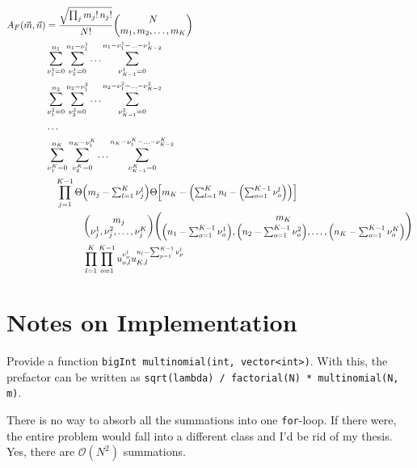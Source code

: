 \documentclass[
	english,
	a4paper,
	fontsize=10pt,
	parskip=half,
	titlepage=true,
	DIV=12,
	final
]{scrreprt}
\begin{document}
\begin{align}
\nonumber
	A_F(\vec{m}, \vec{n})
&=
	\frac
		{\sqrt{\prod_j m_j! \, n_j!}}
		{N!}
	\mqty(
		N \\
		m_1, m_2, \ldots, m_K
	) \\ 
\nonumber
&	\sum_{\nu_1^1 = 0}^{n_1}
	\sum_{\nu_2^1 = 0}^{n_1 - \nu_1^1}
	\ldots
	\sum_{\nu_{K-1}^1 = 0}^{n_1 - \nu_1^1 - \ldots - \nu_{K-2}^1} \\
\nonumber
&	\sum_{\nu_1^2 = 0}^{n_2}
	\sum_{\nu_2^2 = 0}^{n_2 - \nu_1^2}
	\ldots
	\sum_{\nu_{K-1}^2 = 0}^{n_2 - \nu_1^2 - \ldots - \nu_{K-2}^2} \\
\nonumber
&	\ldots \\
\nonumber
&	\sum_{\nu_1^K = 0}^{n_K}
	\sum_{\nu_2^K = 0}^{n_K - \nu_1^K}
	\ldots
	\sum_{\nu_{K-1}^K = 0}^{n_K - \nu_1^K - \ldots - \nu_{K-2}^K} \\
\nonumber
&\quad
	\prod_{j=1}^{K-1}
		\Theta\qty(
			m_j -
			 {\textstyle \sum_{l=1}^{K} \nu_j^l}
		)
		\Theta\qty[
			m_K - 
			{\textstyle \qty(\sum_{l=1}^{K}
				n_l - 
				\qty(
					\sum_{o=1}^{K-1} \nu_o^l
				))
			}
		] \\
\nonumber
&\qquad\qquad
		\mqty(
			m_j \\
			\nu_j^1, \nu_j^2, \ldots, \nu_j^K
		)
		\mqty(
			m_K \\
			\qty(n_1 - {
				\textstyle \sum_{o=1}^{K-1} \nu_o^1
			}),
			\qty(n_2 - {
				\textstyle \sum_{o=1}^{K-1} \nu_o^2
			}),
			\ldots,
			\qty(n_K - {
				\textstyle \sum_{o=1}^{K-1} \nu_o^K
			})
		) \\
&\qquad\qquad
	\prod_{l=1}^K
	\prod_{o=1}^{K-1}
		u_{o,l}^{\nu_o^l}
		u_{K,l}^{n_l - \sum_{p=1}^{K-1} \nu_p^l}
\end{align}


\section{Notes on Implementation}
Provide a function \texttt{bigInt multinomial(int, vector<int>)}. With this, the prefactor can be written as \texttt{sqrt(lambda) / factorial(N) * multinomial(N, m)}.

There is no way to absorb all the summations into one \texttt{for}-loop. If there were, the entire problem would fall into a different class and I'd be rid of my thesis. Yes, there are $\mathcal{O}(N^2)$ summations.
\end{document}
